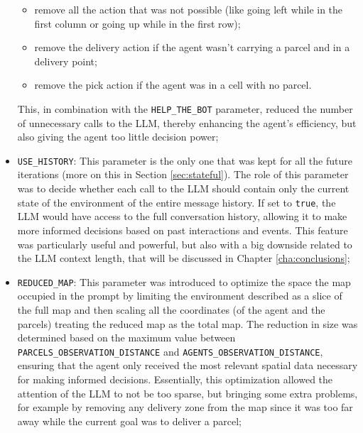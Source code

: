 \begin{itemize}
\begin{itemize}
      \item remove all the action that was not possible (like going left while
        in the first column or going up while in the first row);

      \item remove the delivery action if the agent wasn't carrying a parcel and
        in a delivery point;

      \item remove the pick action if the agent was in a cell with no parcel.
    \end{itemize}
    This, in combination with the \texttt{HELP\_THE\_BOT} parameter, reduced the
    number of unnecessary calls to the LLM, thereby enhancing the agent's
    efficiency, but also giving the agent too little decision power;

  \item \texttt{USE\_HISTORY}: This parameter is the only one that was kept for all
    the future iterations (more on this in Section \ref{sec:stateful}). The role
    of this parameter was to decide whether each call to the LLM should contain
    only the current state of the environment of the entire message history. If set
    to \texttt{true}, the LLM would have access to the full conversation history,
    allowing it to make more informed decisions based on past interactions and
    events. This feature was particularly useful and powerful, but also with a
    big downside related to the LLM context length, that will be discussed in Chapter
    \ref{cha:conclusions};

  \item \texttt{REDUCED\_MAP}: This parameter was introduced to optimize the space
    the map occupied in the prompt by limiting the environment described as a slice
    of the full map and then scaling all the coordinates (of the agent and the
    parcels) treating the reduced map as the total map. The reduction in size
    was determined based on the maximum value between \texttt{PARCELS\_OBSERVATION\_DISTANCE}
    and \texttt{AGENTS\_OBSERVATION\_DISTANCE}, ensuring that the agent only received
    the most relevant spatial data necessary for making informed decisions.
    Essentially, this optimization allowed the attention of the LLM to not be too
    sparse, but bringing some extra problems, for example by removing any delivery
    zone from the map since it was too far away while the current goal was to deliver
    a parcel;


\end{itemize}
